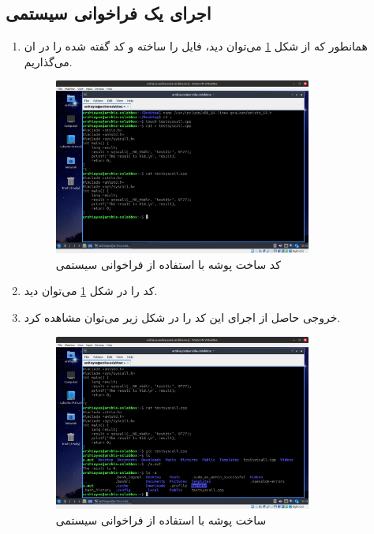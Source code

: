 \documentclass[12pt]{article}
\begin{document}
        \subsection{اجرای یک فراخوانی سیستمی}
        \begin{enumerate}
        \item 
        همانطور که از شکل 
        \ref{im3}
        می‌توان دید، فایل را ساخته و کد گفته شده را در ان می‌گذاریم.

        \begin{figure}[H]
		\centering
		\includegraphics[width=0.8\textwidth]{report2-resources/3.png}
		\caption{کد ساخت پوشه با استفاده از فراخوانی سیستمی}
        \label{im3}
	\end{figure}

        

        \item کد را در شکل
        \ref{im3}
        می‌توان دید.

        \item خروجی حاصل از اجرای این کد را در شکل زیر می‌توان مشاهده کرد.

        \begin{figure}[H]
		\centering
		\includegraphics[width=0.8\textwidth]{report2-resources/5.png}
		\caption{ساخت پوشه با استفاده از فراخوانی سیستمی}
	\end{figure}


\end{enumerate}
\end{document}
